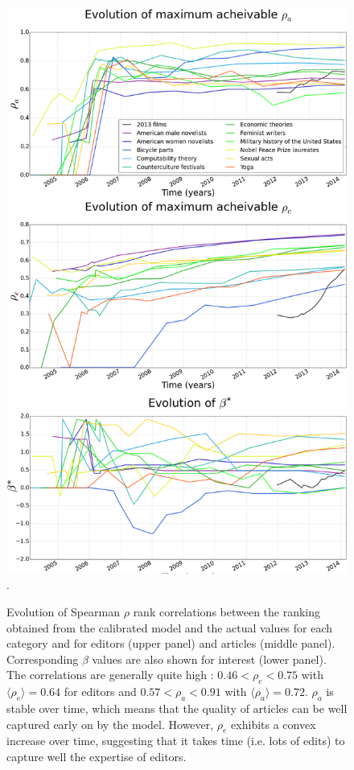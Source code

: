 \begin{figure}[!t]
\centering
\includegraphics[width=0.9\columnwidth]{../Figures/rho_combined_with_beta.png}.
\caption{Evolution of Spearman $\rho$ rank correlations between the ranking obtained from the calibrated model and the actual values for each category and for editors (upper panel)  and articles (middle panel). Corresponding $\beta$ values are also shown for interest (lower panel). The correlations are generally quite high : $ 0.46 < \rho_e < 0.75$ with $\langle \rho_e\rangle = 0.64$ for editors and $0.57 < \rho_a < 0.91$ with $\langle \rho_a\rangle = 0.72$. $\rho_{a}$  is stable over time, which means that the quality of articles can be well captured early on by the model. However, $\rho_e$ exhibits a convex increase over time, suggesting that it takes time (i.e. lots of edits) to capture well the expertise of editors.}
\label{fig:rhotime}


\end{figure}

	



